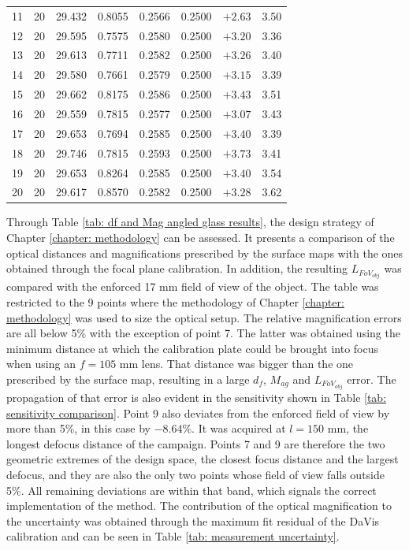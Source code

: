 \begin{table}[htbp]
\begin{tabular}{lrrrrrrr}
        11 & 20 & 29.432 & 0.8055 & 0.2566 & 0.2500 & $+2.63$ &  3.50 \\
        12 & 20 & 29.595 & 0.7575 & 0.2580 & 0.2500 & $+3.20$ &  3.36 \\
        13 & 20 & 29.613 & 0.7711 & 0.2582 & 0.2500 & $+3.26$ &  3.40 \\
        14 & 20 & 29.580 & 0.7661 & 0.2579 & 0.2500 & $+3.15$ &  3.39 \\
        15 & 20 & 29.662 & 0.8175 & 0.2586 & 0.2500 & $+3.43$ &  3.51 \\
        16 & 20 & 29.559 & 0.7815 & 0.2577 & 0.2500 & $+3.07$ &  3.43 \\
        17 & 20 & 29.653 & 0.7694 & 0.2585 & 0.2500 & $+3.40$ &  3.39 \\
        18 & 20 & 29.746 & 0.7815 & 0.2593 & 0.2500 & $+3.73$ &  3.41 \\
        19 & 20 & 29.653 & 0.8264 & 0.2585 & 0.2500 & $+3.40$ &  3.54 \\
        20 & 20 & 29.617 & 0.8570 & 0.2582 & 0.2500 & $+3.28$ &  3.62 \\
        \bottomrule
    \end{tabular}
\end{table}

Through Table \ref{tab: df and Mag angled glass results}, the design strategy of Chapter \ref{chapter: methodology} can be assessed. It presents a comparison of the optical distances and magnifications prescribed by the surface maps with the ones obtained through the focal plane calibration. In addition, the resulting $L_{FoV_{obj}}$ was compared with the enforced 17 mm field of view of the object. The table was restricted to the 9 points where the methodology of Chapter \ref{chapter: methodology} was used to size the optical setup. The relative magnification errors are all below 5\% with the exception of point 7. The latter was obtained using the minimum distance at which the calibration plate could be brought into focus when using an $f = 105$ mm lens. That distance was bigger than the one prescribed by the surface map, resulting in a large $d_f$, $M_{ag}$ and $L_{FoV_{obj}}$ error. The propagation of that error is also evident in the sensitivity shown in Table \ref{tab: sensitivity comparison}. Point 9 also deviates from the enforced field of view by more than 5\%, in this case by $-8.64$\%. It was acquired at $l = 150$ mm, the longest defocus distance of the campaign. Points 7 and 9 are therefore the two geometric extremes of the design space, the closest focus distance and the largest defocus, and they are also the only two points whose field of view falls outside 5\%. All remaining deviations are within that band, which signals the correct implementation of the method. The contribution of the optical magnification to the uncertainty was obtained through the maximum fit residual of the DaVis calibration and can be seen in Table \ref{tab: measurement uncertainty}.

